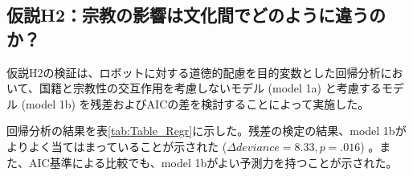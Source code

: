 \documentclass[a4j,12pt]{jreport}
\begin{document}
\subsection{仮説H2：宗教の影響は文化間でどのように違うのか？}
仮説H2の検証は、ロボットに対する道徳的配慮を目的変数とした回帰分析において、国籍と宗教性の交互作用を考慮しないモデル (model 1a) と考慮するモデル (model 1b) を残差およびAICの差を検討することによって実施した。


回帰分析の結果を表\ref{tab:Table_Regr}に示した。残差の検定の結果、model 1bがよりよく当てはまっていることが示された ($\Delta deviance = 8.33, p = .016$) 。また、AIC基準による比較でも、model 1bがよい予測力を持つことが示された。
\end{document}
